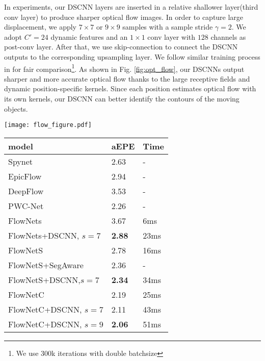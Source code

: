 \documentclass[runningheads]{llncs}
\makeatletter
\newcommand\figcaption{\def\@captype{figure}\caption}
\newcommand\tabcaption{\def\@captype{table}\caption}
\makeatother
\begin{document}
In experiments, our DSCNN layers are inserted in a relative shallower layer(\ie \the third conv layer) to produce sharper optical flow images. In order to capture large displacement, we apply $7\times7$ or $9\times9$ samples with a sample stride $\gamma = 2$. We adopt $C'=24$ dynamic features and an $1\times 1$ conv layer with $128$ channels as post-conv layer. After that, we use skip-connection to connect the DSCNN outputs to the corresponding upsampling layer. 
We follow similar training process in \cite{dosovitskiy2015flownet} for fair comparison\footnote{We use 300k iterations with double batchsize}.
As shown in Fig. \ref{fig:opt_flow}, our DSCNNs output sharper and more accurate optical flow thanks to the large receptive fields and dynamic position-specific kernels. Since each position estimates optical flow with its own kernels, our DSCNN can better identify the contours of the moving objects. 
\begin{figtab}[!h]
\begin{minipage}[!h]{0.45\textwidth} 
\centering
\texttt{[image: flow\_figure.pdf]}
\figcaption{Training loss of flow estimation. We use moving average with window size of 2k iterations when plotting the loss curve.}
\label{fig:flownet_loss}
\end{minipage}%
  \qquad
\begin{minipage}[!h]{0.45\textwidth} 
\centering
\begin{tabular}{L{3.8cm}|C{0.8cm}|C{0.8cm}}
\hline
	model & aEPE &  Time\\ \hline\hline
	Spynet \cite{ranjan2016optical} & 2.63 & -\\ 
	EpicFlow \cite{revaud2015epicflow} & 2.94 & -  \\ 
	DeepFlow \cite{weinzaepfel2013deepflow} & 3.53 & -\\ 
	PWC-Net \cite{sun2017pwc} & 2.26 & - \\ \hline
	FlowNets \cite{ilg2016flownet} & 3.67 & 6ms\\ 
	FlowNets+DSCNN, $s=7$ & \textbf{2.88} &23ms\\ \hline
	FlowNetS \cite{ilg2016flownet}  & 2.78 & 16ms\\ 
	FlowNetS+SegAware \cite{harley2017segmentation} & 2.36& - \\ 
	FlowNetS+DSCNN,$s=7 $ & \textbf{2.34} &34ms\\ \hline
	FlowNetC \cite{ilg2016flownet}  & 2.19 & 25ms\\ 
	FlowNetC+DSCNN, $s=7$ & 2.11 &43ms\\ 
	FlowNetC+DSCNN, $s=9$ &\textbf{2.06}&51ms\\ \hline
\end{tabular}
\tabcaption{aEPE and running time evaluation of optical flow estimation.}
\label{tab:eval_flow}
\end{minipage} 
\end{figtab}
\end{document}

